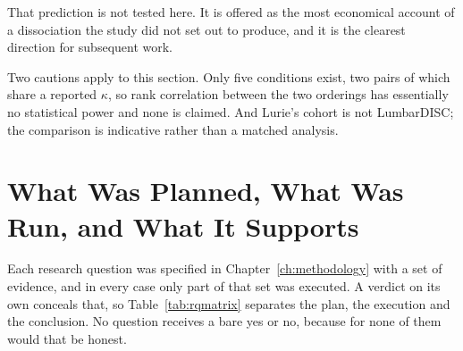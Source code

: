 \documentclass[12pt,a4paper]{report}
\begin{document}
That prediction is not tested here. It is offered as the most economical account
of a dissociation the study did not set out to produce, and it is the clearest
direction for subsequent work.

Two cautions apply to this section. Only five conditions exist, two pairs of
which share a reported $\kappa$, so rank correlation between the two orderings
has essentially no statistical power and none is claimed. And Lurie's cohort is
not LumbarDISC; the comparison is indicative rather than a matched analysis.

\section{What Was Planned, What Was Run, and What It Supports}
\label{sec:disc-completion}

Each research question was specified in Chapter~\ref{ch:methodology} with a set
of evidence, and in every case only part of that set was executed. A verdict on
its own conceals that, so Table~\ref{tab:rqmatrix} separates the plan, the
execution and the conclusion. No question receives a bare yes or no, because for
none of them would that be honest.
\end{document}
